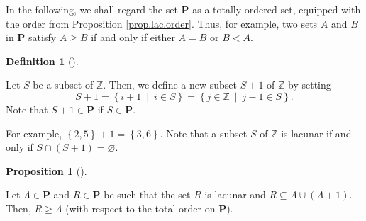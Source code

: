 \documentclass[numbers=enddot,12pt,final,onecolumn,notitlepage]{scrartcl}%
\theoremstyle{definition}
\newtheorem{prop}[theo]{Proposition}
\newenvironment{proposition}[1][]
{\begin{prop}[#1]\begin{leftbar}}
{\end{leftbar}\end{prop}}
\newtheorem{defi}[theo]{Definition}
\newenvironment{definition}[1][]
{\begin{defi}[#1]\begin{leftbar}}
{\end{leftbar}\end{defi}}
\begin{document}
In the following, we shall regard the set $\mathbf{P}$ as a totally ordered
set, equipped with the order from Proposition \ref{prop.lac.order}. Thus, for
example, two sets $A$ and $B$ in $\mathbf{P}$ satisfy $A\geq B$ if and only if
either $A=B$ or $B<A$.

\begin{definition}
\label{def.S+1}Let $S$ be a subset of $\mathbb{Z}$. Then, we define a new
subset $S+1$ of $\mathbb{Z}$ by setting
\[
S+1=\left\{  i+1\ \mid\ i\in S\right\}  =\left\{  j\in\mathbb{Z}\ \mid\ j-1\in
S\right\}  .
\]
Note that $S+1\in\mathbf{P}$ if $S\in\mathbf{P}$.
\end{definition}

For example, $\left\{  2,5\right\}  +1=\left\{  3,6\right\}  $. Note that a
subset $S$ of $\mathbb{Z}$ is lacunar if and only if $S\cap\left(  S+1\right)
=\varnothing$.

\begin{proposition}
\label{prop.lac.RL}Let $\Lambda\in\mathbf{P}$ and $R\in\mathbf{P}$ be such
that the set $R$ is lacunar and $R\subseteq\Lambda\cup\left(  \Lambda
+1\right)  $. Then, $R\geq\Lambda$ (with respect to the total order on
$\mathbf{P}$).
\end{proposition}
\end{document}

